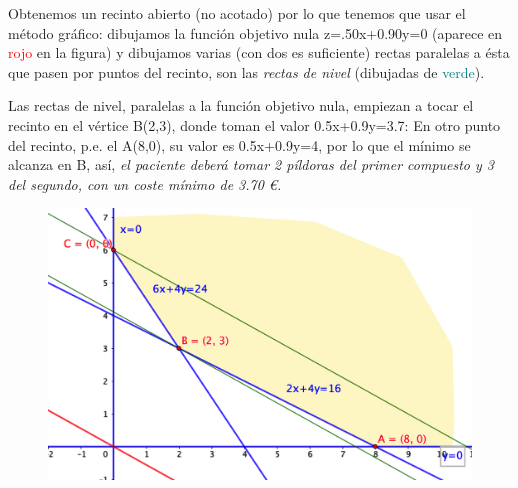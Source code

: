 \vspace{5mm} Obtenemos un recinto abierto (no acotado) por lo que tenemos que usar el método gráfico: dibujamos la función objetivo nula z=.50x+0.90y=0 (aparece en \textcolor{red}{rojo} en la figura) y dibujamos varias (con dos es suficiente) rectas paralelas a ésta que pasen por puntos del recinto, son las \emph{rectas de nivel} (dibujadas de \textcolor{teal}{verde}).

\vspace{5mm} Las rectas de nivel, paralelas a la función objetivo nula, empiezan a tocar el recinto en el vértice B(2,3), donde toman el valor 0.5x+0.9y=3.7: En otro punto del recinto, p.e. el A(8,0), su valor es 0.5x+0.9y=4, por lo que el mínimo se alcanza en B, así, \emph{el paciente deberá tomar 2 píldoras del primer compuesto y 3 del segundo, con un coste mínimo de 3.70 \euro.}

\vspace{5mm}
	\begin{figure}[H] 	\centering
	\includegraphics[width=.75\textwidth]{imagenes/img46.png}
\end{figure}


